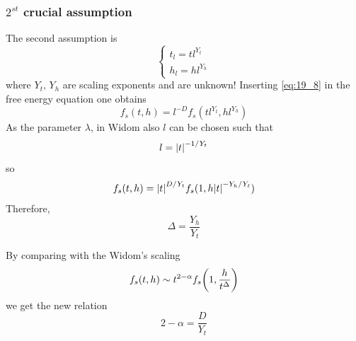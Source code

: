 \documentclass[../main/main.tex]{subfiles}
\begin{document}
\subsubsection{\(  2^{st} \) crucial assumption}
The second assumption is
\begin{equation}
  \begin{cases}
     t_l = t l^{Y_t}\\
  h_l = h l^{Y_h}
  \end{cases}
  \label{eq:19_8}
\end{equation}
where \( Y_t, \, Y_h \) are scaling exponents and are unknown!
Inserting \eqref{eq:19_8} in the free energy equation one obtains
\begin{equation}
  f_s (t,h) = l^{-D} f_s (t l^{Y_t}, h l^{Y_h})
\end{equation}
As the parameter \( \lambda  \), in Widom also \( l \)  can be chosen such that
\begin{equation}
  l= \abs{t}^{-1/Y_t}
\end{equation}
so
\begin{equation}
  f_s (t,h) = \abs{t}^{D/Y_t} f_s (1, h \abs{t}^{-Y_h/Y_t} )
\end{equation}
Therefore,
\begin{equation}
  \Delta = \frac{Y_h}{Y_t}
\end{equation}
\begin{remark}
By comparing with the Widom's scaling
\begin{equation}
  f_s (t,h) \sim t^{2- \alpha } f_s \qty(1, \frac{h}{t^\Delta})
\end{equation}
we get the new relation
\begin{equation}
  2 - \alpha = \frac{D}{Y_t}
\end{equation}
\end{remark}
\end{document}
